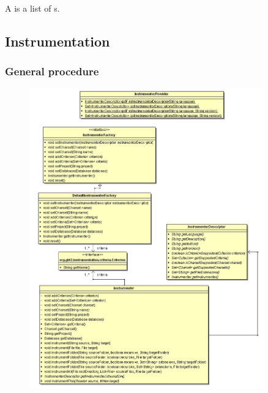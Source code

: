 \paragraph{}

A  is a list of s.

\subsection{Instrumentation} \label{Instrumentation}


\subsubsection{General procedure}

\begin{figure}[hbtp]
 \centering
 \includegraphics[width=0.9\textwidth]{images/instrumentation/instrumentation.png}
 \caption{}
 \label{figure:Classes:Instrumentation}
\end{figure}

